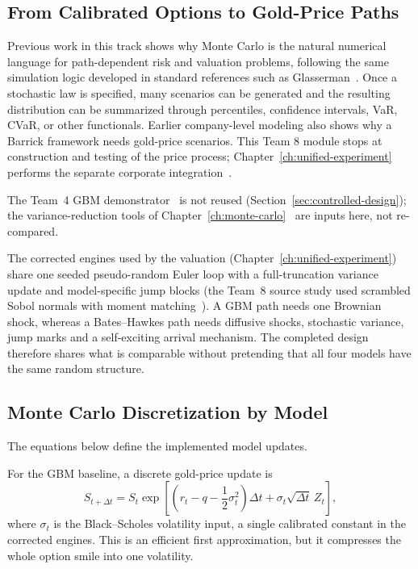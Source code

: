 \subsection{From Calibrated Options to Gold-Price Paths}

Previous work in this track shows why Monte Carlo is the natural numerical language for path-dependent risk and valuation problems, following the same simulation logic developed in standard references such as Glasserman~\cite{Glasserman2004,team3}. Once a stochastic law is specified, many scenarios can be generated and the resulting distribution can be summarized through percentiles, confidence intervals, VaR, CVaR, or other functionals. Earlier company-level modeling also shows why a Barrick framework needs gold-price scenarios. This Team 8 module stops at construction and testing of the price process; Chapter~\ref{ch:unified-experiment} performs the separate corporate integration~\cite{team4,team5}.

The Team~4 GBM demonstrator~\cite{team4} is not reused (Section~\ref{sec:controlled-design}); the variance-reduction tools of Chapter~\ref{ch:monte-carlo}~\cite{team3} are inputs here, not re-compared.

The corrected engines used by the valuation (Chapter~\ref{ch:unified-experiment}) share one seeded pseudo-random Euler loop with a full-truncation variance update and model-specific jump blocks (the Team~8 source study used scrambled Sobol normals with moment matching~\cite{team8}). A GBM path needs one Brownian shock, whereas a Bates--Hawkes path needs diffusive shocks, stochastic variance, jump marks and a self-exciting arrival mechanism. The completed design therefore shares what is comparable without pretending that all four models have the same random structure.

\subsection{Monte Carlo Discretization by Model}

The equations below define the implemented model updates.

For the GBM baseline, a discrete gold-price update is
\begin{equation}
    S_{t+\Delta t}
    =
    S_t
    \exp\left[
        \left(r_t-q-\frac{1}{2}\sigma_t^2\right)\Delta t
        + \sigma_t\sqrt{\Delta t}\,Z_t
    \right],
\end{equation}
where \(\sigma_t\) is the Black--Scholes volatility input, a single calibrated constant in the corrected engines. This is an efficient first approximation, but it compresses the whole option smile into one volatility.

